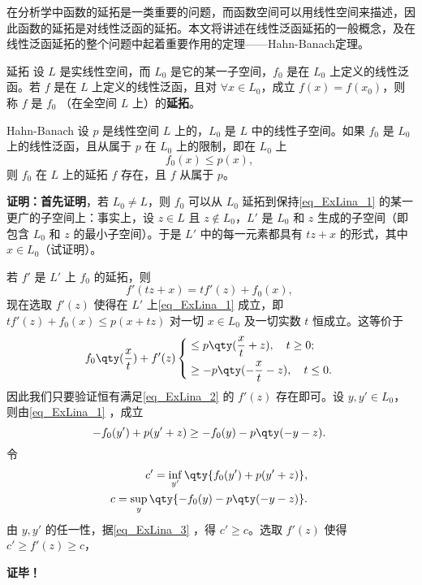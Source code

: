 
在分析学中函数的延拓是一类重要的问题，而函数空间可以用线性空间来描述，因此函数的延拓是对线性泛函的延拓。本文将讲述在线性泛函延拓的一般概念，及在线性泛函延拓的整个问题中起着重要作用的定理——Hahn-Banach定理。

\begin{definition}{延拓}
设 $L$ 是实线性空间，而 $L_0$ 是它的某一子空间，$f_0$ 是在 $L_0$ 上定义的线性泛函。若 $f$ 是在 $L$ 上定义的线性泛函，且对 $\forall x\in L_0$，成立 $f(x)=f(x_0)$，则称 $f$ 是 $f_0$ （在全空间 $L$ 上）的\textbf{延拓}。
\end{definition}


\begin{theorem}{Hahn-Banach}
设 $p$ 是线性空间 $L$ 上的，$L_0$ 是 $L$ 中的线性子空间。如果 $f_0$ 是 $L_0$ 上的线性泛函，且从属于 $p$ 在 $L_0$ 上的限制，即在 $L_0$ 上
\begin{equation}\label{eq_ExLina_1}
f_0(x)\leq p(x),~
\end{equation}
则 $f_0$ 在 $L$ 上的延拓 $f$ 存在，且 $f$ 从属于 $p$。
\end{theorem}

\textbf{证明：}\textbf{首先证明}，若 $L_0\neq L$，则 $f_0$ 可以从 $L_0$ 延拓到保持\autoref{eq_ExLina_1} 的某一更广的子空间上：事实上，设 $z\in L$ 且 $z\notin L_0$，$L'$ 是 $L_0$ 和 $z$ 生成的子空间（即包含 $L_0$ 和 $z$ 的最小子空间）。于是 $L'$ 中的每一元素都具有 $tz+x$ 的形式，其中 $x\in L_0$（试证明）。

若 $f'$ 是 $L'$ 上 $f_0$ 的延拓，则
\begin{equation}
f'(tz+x)=tf'(z)+f_0(x),~
\end{equation}
现在选取 $f'(z)$ 使得在 $L'$ 上\autoref{eq_ExLina_1} 成立，即 $tf'(z)+f_0(x)\leq p(x+tz)$ 对一切 $x\in L_0$ 及一切实数 $t$ 恒成立。这等价于
\begin{equation}\label{eq_ExLina_2}
f_0\qty(\frac{x}{t})+f'(z)\left\{\begin{aligned}
&\leq p\qty(\frac{x}{t}+z),\quad t\geq 0;\\
&\geq -p\qty(-\frac{x}{t}-z),\quad t\leq 0.
\end{aligned}\right.
~
\end{equation}
因此我们只要验证恒有满足\autoref{eq_ExLina_2} 的 $f'(z)$ 存在即可。设 $y,y'\in L_0$，则由\autoref{eq_ExLina_1} ，成立
\begin{equation}\label{eq_ExLina_3}
-f_0(y')+p(y'+z)\geq -f_0(y)-p\qty(-y-z).~
\end{equation}
 令 
 \begin{equation}
 \begin{aligned}
 c'=\inf_{y'}\qty{f_0(y')+p(y'+z)},\\
 c=\sup_y\qty{-f_0(y)-p\qty(-y-z)}.
 \end{aligned}~
 \end{equation}
 由 $y,y'$ 的任一性，据\autoref{eq_ExLina_3} ，得 $c'\geq c$。选取 $f'(z)$ 使得 $c'\geq f'(z)\geq c$，



\textbf{证毕！}



